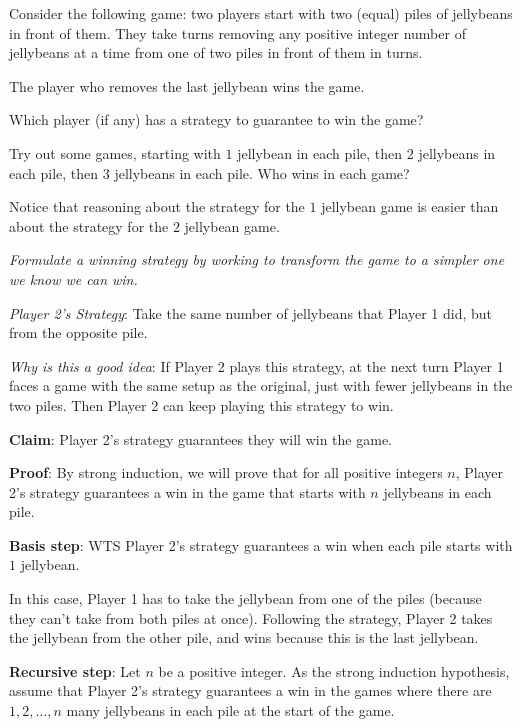 \documentclass[12pt, oneside]{article}
\begin{document}
Consider the following game: two players start with 
two (equal) piles of jellybeans in front of them.
They take turns removing any positive integer number
of jellybeans at a time from one of two piles in 
front of them in turns.

The player who removes the last jellybean wins the game.

Which player (if any) has a strategy to guarantee
to win the game?


Try out some games, starting with $1$ jellybean in each pile,
then $2$ jellybeans in each pile, then $3$ jellybeans in each pile.
Who wins in each game?

\vspace{200pt}


Notice that reasoning about the strategy for the $1$ jellybean 
game is easier than about the strategy for the $2$ jellybean game.

{\it Formulate a winning strategy by working to 
transform the game to a simpler one we know we can win.}

\newpage

{\it Player 2's Strategy}: Take the same number of jellybeans that Player 1 did, 
but from the opposite pile. 


{\it Why is this a good idea}: If Player 2 plays this strategy, at the next turn
Player 1 faces a game with the same setup as the original, just with fewer
jellybeans in the two piles. Then Player 2 can keep playing this strategy to win.

{\bf Claim}: Player 2's strategy guarantees they will win the game.

{\bf Proof}: By strong induction, we will prove that for all positive 
integers $n$, Player 2's strategy guarantees a win in the game that starts with 
$n$ jellybeans in each pile.

{\bf Basis step}: WTS Player 2's strategy guarantees a win 
when each pile starts with $1$ jellybean.

In this case, Player 1 has to take the jellybean from one of the piles
(because they can't take from both piles at once).
Following the strategy, Player 2 takes the jellybean from the 
other pile, and wins because this is the last jellybean.

{\bf Recursive step}: Let $n$ be a positive integer. 
As the strong induction hypothesis, assume that
Player 2's strategy guarantees a win in the games 
where there are $1, 2, \ldots, n$ many jellybeans in each 
pile at the start of the game.
\end{document}
